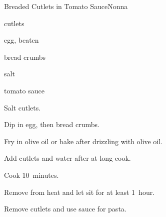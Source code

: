 \begin{recipe}{Breaded Cutlets in Tomato Sauce}{Nonna}{}

\begin{ingredients}
\item {} cutlets
\item egg, beaten
\item bread crumbs
\item salt
\item tomato sauce
\end{ingredients}

\begin{directions}
\item Salt cutlets.
\item Dip in egg, then bread crumbs.
\item Fry in olive oil or bake after drizzling with olive oil.
\item Add cutlets and  water after at long cook.
\item Cook 10~minutes.
\item Remove from heat and let sit for at least 1~hour.
\item Remove cutlets and use sauce for pasta.  
\end{directions}

\end{recipe}
